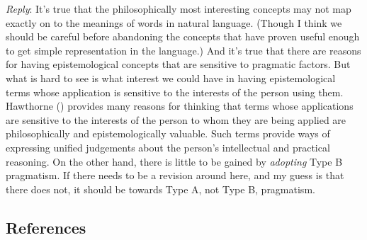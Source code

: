 \documentclass[
  10pt,
  letterpaper,
  DIV=11,
  numbers=noendperiod,
  twoside]{scrartcl}
\begin{document}
\emph{Reply}: It's true that the philosophically most interesting
concepts may not map exactly on to the meanings of words in natural
language. (Though I think we should be careful before abandoning the
concepts that have proven useful enough to get simple representation in
the language.) And it's true that there are reasons for having
epistemological concepts that are sensitive to pragmatic factors. But
what is hard to see is what interest we could have in having
epistemological terms whose application is sensitive to the interests of
the person using them. Hawthorne ()
provides many reasons for thinking that terms whose applications are
sensitive to the interests of the person to whom they are being applied
are philosophically and epistemologically valuable. Such terms provide
ways of expressing unified judgements about the person's intellectual
and practical reasoning. On the other hand, there is little to be gained
by \emph{adopting} Type B pragmatism. If there needs to be a revision
around here, and my guess is that there does not, it should be towards
Type A, not Type B, pragmatism.

\subsection*{References}\label{references}
\end{document}
